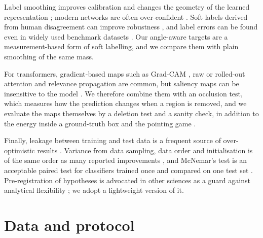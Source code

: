 \documentclass[11pt]{article}
\begin{document}
Label smoothing \citep{szegedy2016inception} improves calibration and changes the geometry of the learned
representation \citep{muller2019labelsmoothing}; modern networks are often over-confident
\citep{guo2017calibration}. Soft labels derived from human disagreement can improve robustness
\citep{peterson2019human}, and label errors can be found even in widely used benchmark datasets
\citep{northcutt2021confident}.
Our angle-aware targets are a measurement-based form of soft labelling, and we compare them with plain
smoothing of the same mass.

For transformers, gradient-based maps such as Grad-CAM \citep{selvaraju2017gradcam}, raw or rolled-out attention
\citep{abnar2020attention} and relevance propagation \citep{chefer2021transformer} are common, but saliency
maps can be insensitive to the model \citep{adebayo2018sanity}. We therefore combine them with an occlusion test, which
measures how the prediction changes when a region is removed, and we evaluate the maps themselves by a deletion
test and a sanity check, in addition to the energy inside a ground-truth box and the pointing game
\citep{zhang2018excitation}.

Finally, leakage between training and test data is a frequent source of over-optimistic results
\citep{kapoor2023leakage}. Variance from data sampling, data order and initialisation is of the same order as many reported
improvements \citep{bouthillier2021variance}, and McNemar's test is an acceptable paired test for classifiers
trained once and compared on one test set \citep{dietterich1998tests}. Pre-registration of hypotheses is advocated in other sciences as a guard
against analytical flexibility \citep{nosek2018preregistration}; we adopt a lightweight version of it.

\section{Data and protocol}
\label{sec:data}
\end{document}
